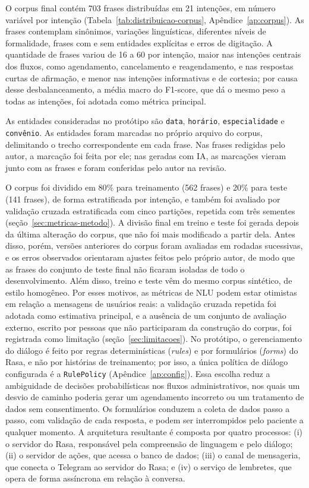 \documentclass[12pt,a4paper]{extarticle}
\begin{document}
O corpus final contém 703 frases distribuídas em 21 intenções, em número variável por intenção (Tabela~\ref{tab:distribuicao-corpus}, Apêndice~\ref{ap:corpus}). As frases contemplam sinônimos, variações linguísticas, diferentes níveis de formalidade, frases com e sem entidades explícitas e erros de digitação. A quantidade de frases variou de 16 a 60 por intenção, maior nas intenções centrais dos fluxos, como agendamento, cancelamento e reagendamento, e nas respostas curtas de afirmação, e menor nas intenções informativas e de cortesia; por causa desse desbalanceamento, a média macro do F1-score, que dá o mesmo peso a todas as intenções, foi adotada como métrica principal.

As entidades consideradas no protótipo são \texttt{data}, \texttt{horário}, \texttt{especialidade} e \texttt{convênio}. As entidades foram marcadas no próprio arquivo do corpus, delimitando o trecho correspondente em cada frase. Nas frases redigidas pelo autor, a marcação foi feita por ele; nas geradas com IA, as marcações vieram junto com as frases e foram conferidas pelo autor na revisão.

O corpus foi dividido em 80\% para treinamento (562 frases) e 20\% para teste (141 frases), de forma estratificada por intenção, e também foi avaliado por validação cruzada estratificada com cinco partições, repetida com três sementes (seção~\ref{sec:metricas-metodo}). A divisão final em treino e teste foi gerada depois da última alteração do corpus, que não foi mais modificado a partir dela. Antes disso, porém, versões anteriores do corpus foram avaliadas em rodadas sucessivas, e os erros observados orientaram ajustes feitos pelo próprio autor, de modo que as frases do conjunto de teste final não ficaram isoladas de todo o desenvolvimento. Além disso, treino e teste vêm do mesmo corpus sintético, de estilo homogêneo. Por esses motivos, as métricas de NLU podem estar otimistas em relação a mensagens de usuários reais: a validação cruzada repetida foi adotada como estimativa principal, e a ausência de um conjunto de avaliação externo, escrito por pessoas que não participaram da construção do corpus, foi registrada como limitação (seção~\ref{sec:limitacoes}).
\vspace{0.5em}
No protótipo, o gerenciamento do diálogo é feito por regras determinísticas (\textit{rules}) e por formulários (\textit{forms}) do Rasa, e não por histórias de treinamento; por isso, a única política de diálogo configurada é a \texttt{RulePolicy} (Apêndice~\ref{ap:config}). Essa escolha reduz a ambiguidade de decisões probabilísticas nos fluxos administrativos, nos quais um desvio de caminho poderia gerar um agendamento incorreto ou um tratamento de dados sem consentimento. Os formulários conduzem a coleta de dados passo a passo, com validação de cada resposta, e podem ser interrompidos pelo paciente a qualquer momento. A arquitetura resultante é composta por quatro processos: (i) o servidor do Rasa, responsável pela compreensão de linguagem e pelo diálogo; (ii) o servidor de ações, que acessa o banco de dados; (iii) o canal de mensageria, que conecta o Telegram ao servidor do Rasa; e (iv) o serviço de lembretes, que opera de forma assíncrona em relação à conversa.
\end{document}
